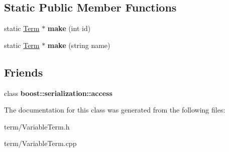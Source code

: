\subsection*{\-Static \-Public \-Member \-Functions}
\begin{DoxyCompactItemize}
\item 
\hypertarget{classVariableTerm_af118e2572aaf9496ab9ccebe0728fe71}{static \hyperlink{classTerm}{\-Term} $\ast$ {\bfseries make} (int id)}\label{classVariableTerm_af118e2572aaf9496ab9ccebe0728fe71}

\item 
\hypertarget{classVariableTerm_a799b5a5ff8468595c4f398a4aa654e78}{static \hyperlink{classTerm}{\-Term} $\ast$ {\bfseries make} (string name)}\label{classVariableTerm_a799b5a5ff8468595c4f398a4aa654e78}

\end{DoxyCompactItemize}
\subsection*{\-Friends}
\begin{DoxyCompactItemize}
\item 
\hypertarget{classVariableTerm_ac98d07dd8f7b70e16ccb9a01abf56b9c}{class {\bfseries boost\-::serialization\-::access}}\label{classVariableTerm_ac98d07dd8f7b70e16ccb9a01abf56b9c}

\end{DoxyCompactItemize}


\-The documentation for this class was generated from the following files\-:\begin{DoxyCompactItemize}
\item 
term/\-Variable\-Term.\-h\item 
term/\-Variable\-Term.\-cpp\end{DoxyCompactItemize}
